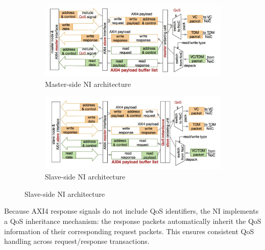 \begin{figure}[htbp]
    \begin{subfigure}[b]{0.48\textwidth}
        \centering
        \includegraphics[width=\textwidth]{img/Master-Side_NI.png}
        \caption{Master-side NI architecture}
        \label{fig:master_NI}
    \end{subfigure}
    \hfill
    \begin{subfigure}[b]{0.48\textwidth}
        \centering
        \includegraphics[width=\textwidth]{img/Slave-Side_NI.png}
        \caption{Slave-side NI architecture}
        \label{fig:slave_NI}
    \end{subfigure}
\end{figure}


\label{qos_inheritance}
Because AXI4 response signals do not include QoS identifiers, the NI implements a QoS inheritance mechanism: the response packets automatically inherit the QoS information of their corresponding request packets. This ensures consistent QoS handling across request/response transactions.


